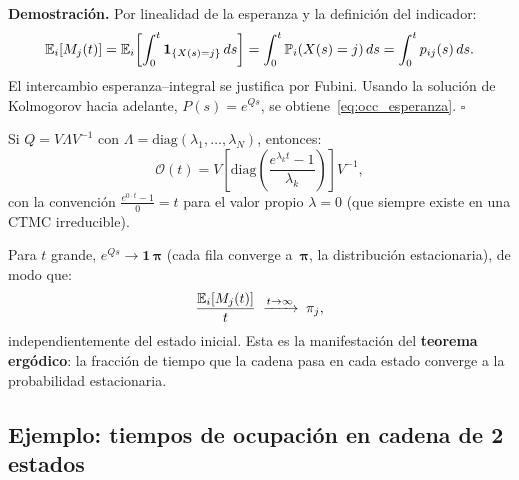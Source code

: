 \documentclass[11pt, letterpaper]{article}
\begin{document}
\textbf{Demostración.}  Por linealidad de la esperanza y la
definición del indicador:
\[
  \mathbb{E}_i[M_j(t)] = \mathbb{E}_i\!\left[\int_0^t \mathbf{1}_{\{X(s)=j\}}\,ds\right]
  = \int_0^t \mathbb{P}_i(X(s)=j)\,ds
  = \int_0^t p_{ij}(s)\,ds.
\]
El intercambio esperanza--integral se justifica por Fubini.
Usando la solución de Kolmogorov hacia adelante, $P(s) = e^{Qs}$,
se obtiene~\eqref{eq:occ_esperanza}. $\square$

\begin{notabox}
  Si $Q = V\Lambda V^{-1}$ con
  $\Lambda=\mathrm{diag}(\lambda_1,\ldots,\lambda_N)$, entonces:
  \[
    \mathcal{O}(t) = V\!\left[\mathrm{diag}\!\left(
    \frac{e^{\lambda_k t}-1}{\lambda_k}\right)\right]V^{-1},
  \]
  con la convención $\frac{e^{0\cdot t}-1}{0}=t$ para el valor propio
  $\lambda=0$ (que siempre existe en una CTMC irreducible).
\end{notabox}

\begin{notabox}
  Para $t$ grande, $e^{Qs}\to\mathbf{1}\,\boldsymbol{\pi}$ (cada fila
  converge a~$\boldsymbol{\pi}$, la distribución estacionaria), de modo que:
  \[
    \frac{\mathbb{E}_i[M_j(t)]}{t} \;\xrightarrow{t\to\infty}\; \pi_j,
  \]
  independientemente del estado inicial.  Esta es la manifestación
  del \textbf{teorema ergódico}: la fracción de tiempo que la cadena
  pasa en cada estado converge a la probabilidad estacionaria.
\end{notabox}

\subsection{Ejemplo: tiempos de ocupación en cadena de 2 estados}
\end{document}

